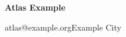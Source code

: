 \documentclass[10pt]{article}
\begin{document}
{\LARGE\bfseries Atlas Example}\par
atlas@example.org\quad Example City\par
\end{document}
